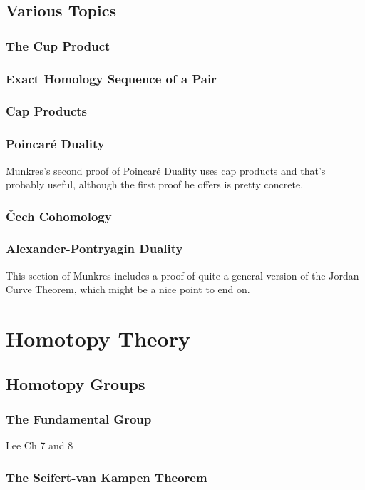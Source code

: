 \documentclass[oneside,english]{amsbook}
\numberwithin{section}{chapter}
\theoremstyle{plain}
\theoremstyle{definition}
\providecommand{\Cech}{\v{C}ech }
\begin{document}
	\chapter{Various Topics}
	\section{The Cup Product}
	\section{Exact Homology Sequence of a Pair}
	\section{Cap Products}
	\section{Poincar\'e Duality}
	
	Munkres's second proof of Poincar\'e Duality uses cap products and that's probably useful, although the first proof he offers is pretty concrete.
	
	\section{\Cech Cohomology}
	\section{Alexander-Pontryagin Duality}
	
	This section of Munkres includes a proof of quite a general version of the Jordan Curve Theorem, which might be a nice point to end on.
	
	\part{Homotopy Theory}
	
	\chapter{Homotopy Groups}
	
	\section{The Fundamental Group}
	
	Lee Ch 7 and 8
	
	\section{The Seifert-van Kampen Theorem}
	
\end{document}
